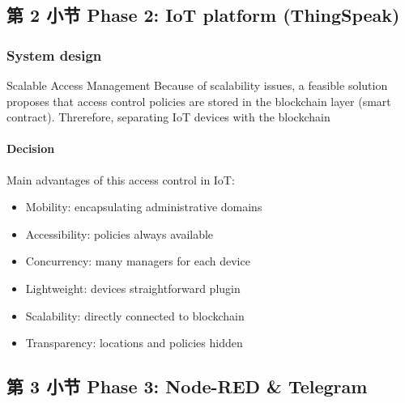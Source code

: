 \documentclass[
    aspectratio=169,                   %
]{beamer}
\begin{document}
\subsection{第 2 小节 Phase 2: IoT platform (ThingSpeak)}

    \begin{frame}
        \frametitle{System design}
        
        \begin{block}{Scalable Access Management}
            Because of scalability issues, a feasible solution proposes that access control policies are stored in the blockchain layer (smart contract). Threrefore, separating IoT devices with the blockchain\cite{novo}
        \end{block}

        \paragraph{Decision} Main advantages of this access control in IoT:

        \begin{itemize}
            \item \alert{Mobility}: encapsulating administrative domains
            \item \alert{Accessibility}: policies always available
            \item \alert{Concurrency}: many managers for each device
            \item \alert{Lightweight}: devices straightforward plugin
            \item \alert{Scalability}: directly connected to blockchain
            \item \alert{Transparency}: locations and policies hidden
        \end{itemize}
    \end{frame}

\subsection{第 3 小节 Phase 3: Node-RED \& Telegram}
\end{document}
